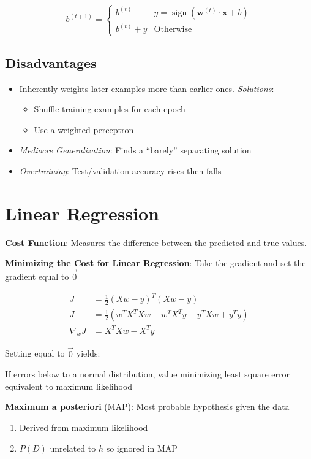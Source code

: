 \documentclass[10pt]{article}
\newcommand{\colortext}[2]{{\color{#1} #2}}
\newcommand{\red}[1]{\colortext{red}{#1}}
\newcommand{\blue}[1]{\colortext{blue}{#1}}
\DeclareMathOperator*{\sign}{sign}
\begin{document}
\begin{multicols}{3}
  \[ b^{(t+1)} = \begin{cases}
                   b^{(t)}      & y = \sign(\mathbf{w}^{(t)}\cdot\mathbf{x} +b) \\
                   b^{(t)} + y  & \text{Otherwise}
                 \end{cases} \]

  \subsection*{Disadvantages}

  \begin{itemize}
    \item Inherently weights later examples more than earlier ones.  \textit{Solutions}:
      \begin{itemize}
        \item Shuffle training examples for each epoch
        \item Use a weighted perceptron
      \end{itemize}
    \item \textit{Mediocre Generalization}: Finds a ``barely'' separating solution
    \item \textit{Overtraining}: Test/validation accuracy rises then falls
  \end{itemize}
  \section{Linear Regression}

  \textbf{Cost Function}: Measures the difference between the predicted and true values.

  \textbf{Minimizing the Cost for Linear Regression}: Take the gradient and set the gradient equal to $\vec{0}$

  \begin{align*}
    J &= \frac{1}{2}(Xw-y)^{T}(Xw-y) \\
    J &= \frac{1}{2}(w^{T}X^{T}Xw - w^{T}X^{T}y -y^{T}Xw + y^{T}y) \\
    \nabla_{w}J &= X^{T}Xw-X^{T}y
  \end{align*}

  Setting equal to $\vec{0}$ yields:

  If errors below to a normal distribution, value \red{minimizing least square error equivalent to maximum likelihood}

  \textbf{\blue{Maximum a posteriori}} (MAP): Most probable hypothesis given the data
  \begin{enumerate}
    \item Derived \red{from maximum likelihood}
    \item $P(D)$ unrelated to $h$ so ignored in MAP
  \end{enumerate}


\end{multicols}
\end{document}
